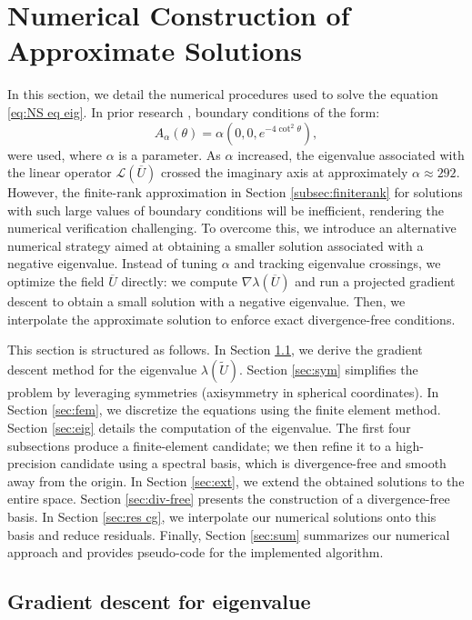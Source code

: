 \documentclass[11pt,a4paper]{article}
\numberwithin{equation}{section}
\begin{document}
\section{Numerical Construction of Approximate Solutions}\label{Sec:num}

In this section, we detail the numerical procedures used to solve the
equation \eqref{eq:NS eq eig}. In prior research {\cite{guillod2023numerical}}, boundary conditions of the
form: 
\[ A_\alpha (\theta) = \alpha ( 0, 0, e^{- 4 \cot^2 \theta} ), \]
were used, where $\alpha$ is a parameter. As $\alpha$ increased, the
eigenvalue associated with the linear operator $\mathcal{L} (\overline{U})$
crossed the imaginary axis at approximately $\alpha \approx 292$. However, the finite-rank approximation in Section \ref{subsec:finiterank} for solutions with such large values of boundary conditions will be inefficient, rendering the numerical verification challenging. To overcome this, we introduce an alternative
numerical strategy aimed at obtaining a smaller solution associated with a
negative eigenvalue.
Instead of tuning $\alpha$ and tracking eigenvalue crossings, we optimize the field $\overline U$ directly: we compute $\nabla \lambda(\overline U)$ and run a projected gradient descent to obtain a small solution with a negative eigenvalue. Then, we interpolate the approximate solution to
enforce exact divergence-free conditions.



This section is structured as follows. In Section \ref{sec:gd}, we derive the
gradient descent method for the eigenvalue $\lambda (\widetilde{U})$. Section
\ref{sec:sym} simplifies the problem by leveraging symmetries (axisymmetry in spherical coordinates). In Section
\ref{sec:fem}, we discretize the equations using the finite element method.
Section \ref{sec:eig} details the computation of the eigenvalue. The first four subsections produce a finite-element candidate; we then refine it to a high-precision candidate using a spectral basis, which is divergence-free and smooth away from the origin. In Section
\ref{sec:ext}, we extend the obtained solutions to the entire space. Section
\ref{sec:div-free} presents the construction of a divergence-free basis. In
Section \ref{sec:res cg}, we interpolate our numerical solutions onto this
basis and reduce residuals. Finally, Section \ref{sec:sum} summarizes our
numerical approach and provides pseudo-code for the implemented algorithm.

\subsection{Gradient descent for eigenvalue}\label{sec:gd}
\end{document}
